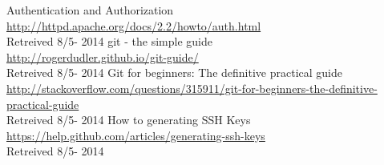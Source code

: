  Authentication and Authorization \\
\url{http://httpd.apache.org/docs/2.2/howto/auth.html}\\
Retreived 8/5- 2014
 git - the simple guide \\
\url{http://rogerdudler.github.io/git-guide/}\\
Retreived 8/5- 2014
 Git for beginners: The definitive practical guide \\
\url{http://stackoverflow.com/questions/315911/git-for-beginners-the-definitive-practical-guide}\\
Retreived 8/5- 2014
 How to generating SSH Keys\\
\url{https://help.github.com/articles/generating-ssh-keys}\\
Retreived 8/5- 2014
